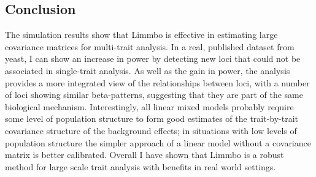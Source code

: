 \subsection{Conclusion}
The simulation results show that Limmbo is effective in estimating large covariance matrices for multi-trait analysis. In a real, published dataset from yeast, I can show an increase in power by detecting new loci that could not be associated in single-trait analysis. As well as the gain in power, the analysis provides a more integrated view of the relationships between loci, with a number of loci showing similar beta-patterns, suggesting that they are part of the same biological mechanism. Interestingly, all linear mixed models probably require some level of population structure to form good estimates of the trait-by-trait covariance structure of the background effects; in situations with low levels of population structure the simpler approach of a linear model without a covariance matrix is better calibrated. Overall I have shown that Limmbo is a robust method for large scale trait analysis with benefits in real world settings.